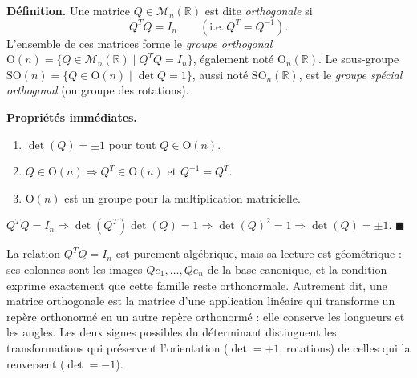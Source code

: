 ﻿%



\begin{tcolorbox}[thmbox]
  \textbf{Définition.}\enspace%
  Une matrice $Q \in \mathcal{M}_n(\mathbb{R})$ est dite \emph{orthogonale} si
  \[
    Q^T Q = I_n \qquad (\text{i.e.}\ Q^T = Q^{-1}).
  \]
  L'ensemble de ces matrices forme le \emph{groupe orthogonal}
  $\mathrm{O}(n) = \{Q \in \mathcal{M}_n(\mathbb{R}) \mid Q^TQ = I_n\}$,
  également noté $\mathrm{O}_n(\mathbb{R})$.
  Le sous-groupe $\mathrm{SO}(n) = \{Q \in \mathrm{O}(n) \mid \det Q = 1\}$,
  aussi noté $\mathrm{SO}_n(\mathbb{R})$,
  est le \emph{groupe spécial orthogonal} (ou groupe des rotations).

  \medskip
  \textbf{Propriétés immédiates.}
  \begin{enumerate}
    \item $\det(Q) = \pm 1$ pour tout $Q \in \mathrm{O}(n)$.
    \item $Q \in \mathrm{O}(n) \Rightarrow Q^T \in \mathrm{O}(n)$ et $Q^{-1} = Q^T$.
    \item $\mathrm{O}(n)$ est un groupe pour la multiplication matricielle.
  \end{enumerate}
\end{tcolorbox}


\begin{mdframed}[style=proofbar]
  $Q^TQ=I_n \Rightarrow \det(Q^T)\det(Q)=1 \Rightarrow {\det(Q)}^2=1
  \Rightarrow \det(Q)=\pm 1$. \hfill$\blacksquare$
\end{mdframed}

\begin{significationintuitive}
  La relation $Q^TQ=I_n$ est purement algébrique, mais sa lecture est géométrique :
  ses colonnes sont les images $Qe_1,\ldots,Qe_n$ de la base canonique, et la
  condition exprime exactement que cette famille reste orthonormale. Autrement dit,
  une matrice orthogonale est la matrice d'une application linéaire qui transforme un
  repère orthonormé en un autre repère orthonormé : elle conserve les longueurs et
  les angles. Les deux signes possibles du déterminant distinguent les transformations
  qui préservent l'orientation ($\det=+1$, rotations) de celles qui la renversent
  ($\det=-1$).
\end{significationintuitive}

